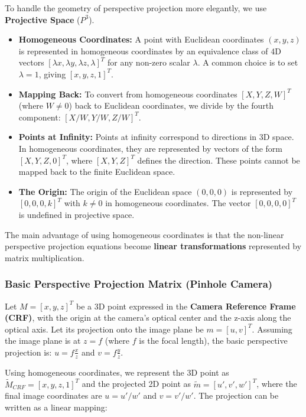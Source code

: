 To handle the geometry of perspective projection more elegantly, we use \textbf{Projective Space} ($P^3$).
\begin{itemize}
    \item \textbf{Homogeneous Coordinates:} A point with Euclidean coordinates $(x, y, z)$ is represented in homogeneous coordinates by an equivalence class of 4D vectors $[\lambda x, \lambda y, \lambda z, \lambda]^T$ for any non-zero scalar $\lambda$. A common choice is to set $\lambda=1$, giving $[x, y, z, 1]^T$.
    \item \textbf{Mapping Back:} To convert from homogeneous coordinates $[X, Y, Z, W]^T$ (where $W \neq 0$) back to Euclidean coordinates, we divide by the fourth component: $[X/W, Y/W, Z/W]^T$.
    \item \textbf{Points at Infinity:} Points at infinity correspond to directions in 3D space. In homogeneous coordinates, they are represented by vectors of the form $[X, Y, Z, 0]^T$, where $[X, Y, Z]^T$ defines the direction. These points cannot be mapped back to the finite Euclidean space.
    \item \textbf{The Origin:} The origin of the Euclidean space $(0,0,0)$ is represented by $[0, 0, 0, k]^T$ with $k \neq 0$ in homogeneous coordinates. The vector $[0, 0, 0, 0]^T$ is undefined in projective space.
\end{itemize}
The main advantage of using homogeneous coordinates is that the non-linear perspective projection equations become \textbf{linear transformations} represented by matrix multiplication.

\subsubsection{Basic Perspective Projection Matrix (Pinhole Camera)}

Let $M = [x, y, z]^T$ be a 3D point expressed in the \textbf{Camera Reference Frame (CRF)}, with the origin at the camera's optical center and the z-axis along the optical axis. Let its projection onto the image plane be $m = [u, v]^T$. Assuming the image plane is at $z=f$ (where $f$ is the focal length), the basic perspective projection is:
$u = f \frac{x}{z}$ and $v = f \frac{y}{z}$.

Using homogeneous coordinates, we represent the 3D point as $\tilde{M}_{CRF} = [x, y, z, 1]^T$ and the projected 2D point as $\tilde{m} = [u', v', w']^T$, where the final image coordinates are $u = u'/w'$ and $v = v'/w'$. The projection can be written as a linear mapping:

